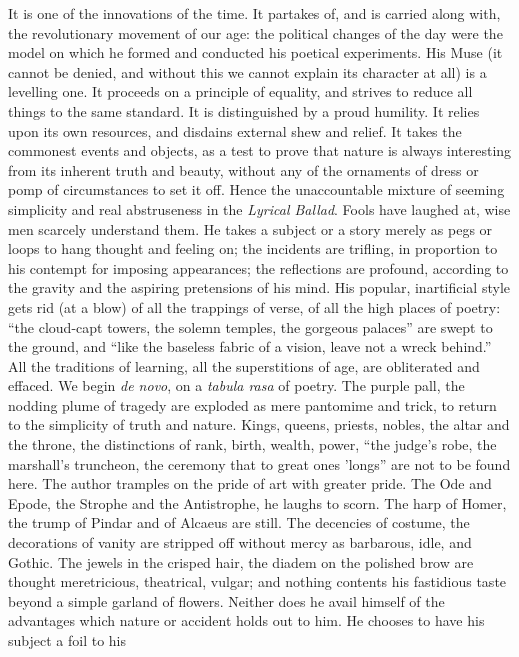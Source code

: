 It is one of the innovations of the time. It partakes of, and is
carried along with, the revolutionary movement of our age: the
political changes of the day were the model on which he formed and
conducted his poetical experiments. His Muse (it cannot be denied,
and without this we cannot explain its character at all) is a
levelling one. It proceeds on a principle of equality, and strives
to reduce all things to the same standard. It is distinguished by
a proud humility. It relies upon its own resources, and disdains
external shew and relief. It takes the commonest events and
objects, as a test to prove that nature is always interesting from
its inherent truth and beauty, without any of the ornaments of
dress or pomp of circumstances to set it off. Hence the
unaccountable mixture of seeming simplicity and real abstruseness
in the \emph{Lyrical Ballad}. Fools have laughed at, wise men
scarcely understand them. He takes a subject or a story merely as
pegs or loops to hang thought and feeling on; the incidents are
trifling, in proportion to his contempt for imposing appearances;
the reflections are profound, according to the gravity and the
aspiring pretensions of his mind. His popular, inartificial style
gets rid (at a blow) of all the trappings of verse, of all the
high places of poetry: ``the cloud-capt towers, the solemn
temples, the gorgeous palaces'' are swept to the ground, and
``like the baseless fabric of a vision, leave not a wreck
behind.''  All the traditions of learning, all the superstitions
of age, are obliterated and effaced. We begin \emph{de novo}, on a
\emph{tabula rasa} of poetry. The purple pall, the nodding plume
of tragedy are exploded as mere pantomime and trick, to return to
the simplicity of truth and nature. Kings, queens, priests,
nobles, the altar and the throne, the distinctions of rank, birth,
wealth, power, ``the judge's robe, the marshall's truncheon, the
ceremony that to great ones 'longs'' are not to be found here. The
author tramples on the pride of art with greater pride. The Ode
and Epode, the Strophe and the Antistrophe, he laughs to
scorn. The harp of Homer, the trump of Pindar and of Alcaeus are
still.  The decencies of costume, the decorations of vanity are
stripped off without mercy as barbarous, idle, and Gothic. The
jewels in the crisped hair, the diadem on the polished brow are
thought meretricious, theatrical, vulgar; and nothing contents his
fastidious taste beyond a simple garland of flowers. Neither does
he avail himself of the advantages which nature or accident holds
out to him. He chooses to have his subject a foil to his

